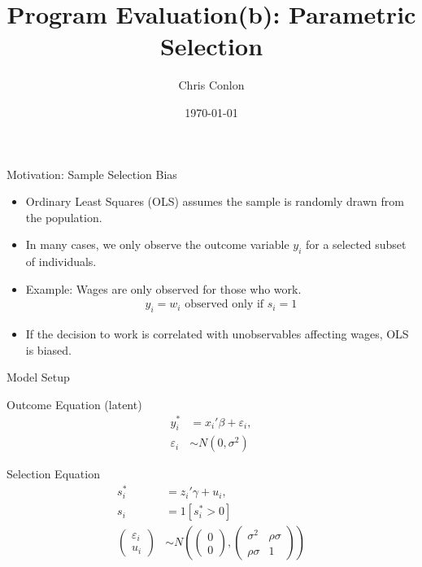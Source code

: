 \documentclass[aspectratio=169,11pt]{beamer}
\title{Program Evaluation(b):
Parametric Selection}
\author{Chris Conlon}
\institute{Applied Econometrics}
\date{\today}
\begin{document}
\frame{\titlepage}


\begin{frame}{Motivation: Sample Selection Bias}
\begin{itemize}
    \item Ordinary Least Squares (OLS) assumes the sample is randomly drawn from the population.
    \item In many cases, we only observe the outcome variable $y_i$ for a selected subset of individuals.
    \item Example: Wages are only observed for those who work.
    \begin{align*}
    y_i = w_i \text{ observed only if } s_i = 1
    \end{align*}
    \item If the decision to work is correlated with unobservables affecting wages, OLS is biased.
\end{itemize}
\end{frame}

\begin{frame}{Model Setup}
\begin{block}{Outcome Equation (latent)}
\begin{align*}
y_i^* &= x_i'\beta + \varepsilon_i, \\
\varepsilon_i &\sim N(0, \sigma^2)
\end{align*}
\end{block}

\begin{block}{Selection Equation}
\begin{align*}
s_i^* &= z_i'\gamma + u_i, \\
s_i &= 1[s_i^* > 0]\\
\begin{pmatrix} \varepsilon_i \\ u_i \end{pmatrix}
&\sim N \left(
\begin{pmatrix} 0 \\ 0 \end{pmatrix},
\begin{pmatrix}
\sigma^2 & \rho\sigma \\
\rho\sigma & 1
\end{pmatrix}
\right)
\end{align*}
\end{block}
\end{frame}
\end{document}
